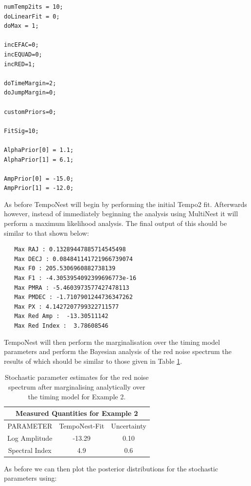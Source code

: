 \documentclass[%
 preprint,
 amsmath,amssymb,amsfonts,
 aps,
]{revtex4-1}
\begin{document}
\begin{lstlisting}
numTemp2its = 10;
doLinearFit = 0;
doMax = 1;

incEFAC=0;
incEQUAD=0;
incRED=1;

doTimeMargin=2;
doJumpMargin=0;

customPriors=0;

FitSig=10;

AlphaPrior[0] = 1.1;
AlphaPrior[1] = 6.1;

AmpPrior[0] = -15.0;
AmpPrior[1] = -12.0;
\end{lstlisting}


As before TempoNest will begin by performing the initial Tempo2 fit.  Afterwards however, instead of immediately beginning the analysis using MultiNest it will perform a maximum likelihood analysis. The final output of this should be similar to that shown below:

\begin{lstlisting}
   Max RAJ : 0.13289447885714545498 
   Max DECJ : 0.084841141721966739074 
   Max F0 : 205.5306960882738139 
   Max F1 : -4.3053954092399696773e-16 
   Max PMRA : -5.4603973577427478113 
   Max PMDEC : -1.7107901244736347262 
   Max PX : 4.1427207799322711577 
   Max Red Amp :  -13.30511142 
   Max Red Index :  3.78608546
\end{lstlisting}

TempoNest will then perform the marginalisation over the timing model parameters and perform the Bayesian analysis of the red noise spectrum the results of which should be similar to those given in Table \ref{Table:Tempo2Fit2}.

\begin{table}
\begin{tabular}{ccc}
\hline\hline
\multicolumn{3}{c}{Measured Quantities for Example 2} \\ 
\hline
PARAMETER    &   TempoNest-Fit         &       Uncertainty  \\
\hline
Log Amplitude      &  -13.29  &        0.10   \\
Spectral Index      &   4.9  &      0.6     \\
\hline
\end{tabular}
\caption{Stochastic parameter estimates for the red noise spectrum after marginalising analytically over the timing model for Example 2.}
\label{Table:Tempo2Fit2}
\end{table}


As before we can then plot the posterior distributions for the stochastic parameters using:
\end{document}
